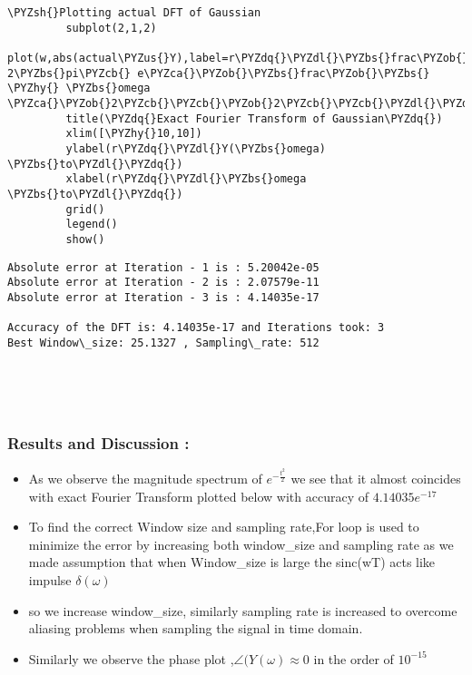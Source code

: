 \documentclass[8pt]{article}
\providecommand{\tightlist}{%
      \setlength{\itemsep}{0pt}\setlength{\parskip}{0pt}}
\def\PYZbs{\char`\\}
\def\PYZus{\char`\_}
\def\PYZob{\char`\{}
\def\PYZcb{\char`\}}
\def\PYZca{\char`\^}
\def\PYZsh{\char`\#}
\def\PYZdl{\char`\$}
\def\PYZhy{\char`\-}
\def\PYZdq{\char`\"}
\begin{document}
\begin{Verbatim}[commandchars=\\\{\}]
         \PYZsh{}Plotting actual DFT of Gaussian
         subplot(2,1,2)
         plot(w,abs(actual\PYZus{}Y),label=r\PYZdq{}\PYZdl{}\PYZbs{}frac\PYZob{}1\PYZcb{}\PYZob{}\PYZbs{}sqrt 2\PYZbs{}pi\PYZcb{} e\PYZca{}\PYZob{}\PYZbs{}frac\PYZob{}\PYZbs{} \PYZhy{} \PYZbs{}omega \PYZca{}\PYZob{}2\PYZcb{}\PYZcb{}\PYZob{}2\PYZcb{}\PYZcb{}\PYZdl{}\PYZdq{})
         title(\PYZdq{}Exact Fourier Transform of Gaussian\PYZdq{})
         xlim([\PYZhy{}10,10])
         ylabel(r\PYZdq{}\PYZdl{}Y(\PYZbs{}omega) \PYZbs{}to\PYZdl{}\PYZdq{})
         xlabel(r\PYZdq{}\PYZdl{}\PYZbs{}omega \PYZbs{}to\PYZdl{}\PYZdq{})
         grid()
         legend()
         show()
\end{Verbatim}


    \begin{Verbatim}[commandchars=\\\{\}]
Absolute error at Iteration - 1 is : 5.20042e-05
Absolute error at Iteration - 2 is : 2.07579e-11
Absolute error at Iteration - 3 is : 4.14035e-17

Accuracy of the DFT is: 4.14035e-17 and Iterations took: 3
Best Window\_size: 25.1327 , Sampling\_rate: 512

    \end{Verbatim}

    \begin{center}
    \end{center}
    { \hspace*{\fill} \\}
    
    \begin{center}
    \end{center}
    { \hspace*{\fill} \\}
    
    \subsubsection{Results and Discussion :}\label{results-and-discussion}

\begin{itemize}
\tightlist
\item
  As we observe the magnitude spectrum of \(e^{-\frac{t^{2}}{ 2}}\) we
  see that it almost coincides with exact Fourier Transform plotted
  below with accuracy of \(4.14035e^{-17}\)
\item
  To find the correct Window size and sampling rate,For loop is used to
  minimize the error by increasing both window\_size and sampling rate
  as we made assumption that when Window\_size is large the sinc(wT)
  acts like impulse \(\delta(\omega)\)
\item
  so we increase window\_size, similarly sampling rate is increased to
  overcome aliasing problems when sampling the signal in time domain.
\item
  Similarly we observe the phase plot ,\(\angle(Y(\omega) \approx 0\) in
  the order of \(10^{-15}\)
\end{itemize}
\end{document}
